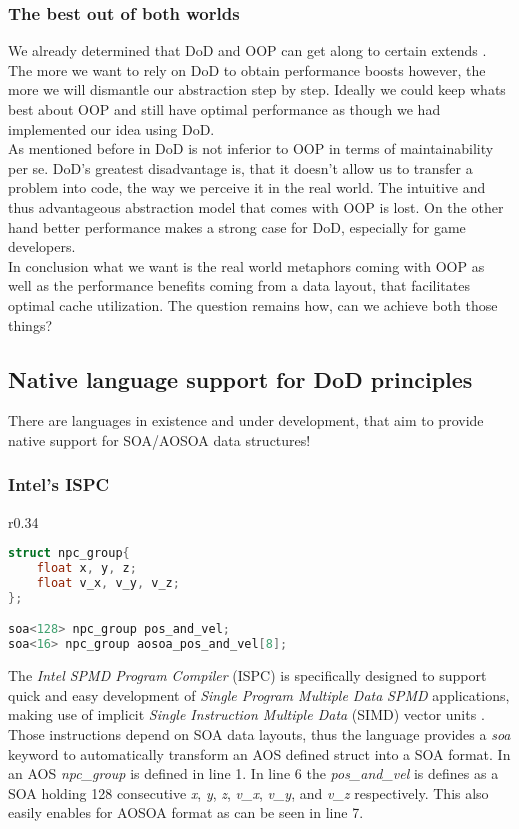 \subsubsection{The best out of both worlds}
We already determined that DoD and OOP can get along to certain extends . The more we want to rely on DoD to obtain performance boosts however, the more we will dismantle our abstraction step by step. Ideally we could keep whats best about OOP and still have optimal performance as though we had implemented our idea using DoD.\\
As mentioned before in  DoD is not inferior to OOP in terms of maintainability per se. DoD's greatest disadvantage is, that it doesn't allow us to transfer a problem into code, the way we perceive it in the real world. The intuitive and thus advantageous abstraction model that comes with OOP is lost. On the other hand better performance makes a strong case for DoD, especially for game developers.\\
In conclusion what we want is the real world metaphors coming with OOP as well as the performance benefits coming from a data layout, that facilitates optimal cache utilization. The question remains how, can we achieve both those things?

\subsection{Native language support for DoD principles}
There are languages in existence and under development, that aim to provide native support for SOA/AOSOA data structures!

\subsubsection{Intel's ISPC}
\begin{wrapfigure}[11]{r}{0.34\textwidth}
\begin{lstlisting}[language=C++,name={ISPC's native SOA support},morekeywords={soa}, label={ispc_npc}]
struct npc_group{
	float x, y, z;
	float v_x, v_y, v_z;
};

soa<128> npc_group pos_and_vel;
soa<16> npc_group aosoa_pos_and_vel[8];
\end{lstlisting}
\end{wrapfigure}
The \textit{Intel SPMD Program Compiler} (ISPC) is specifically designed to support quick and easy development of \textit{Single Program Multiple Data} \textit{SPMD} applications, making use of implicit \textit{Single Instruction Multiple Data} (SIMD) vector units .\\
Those instructions depend on SOA data layouts, thus the language provides a \textit{soa} keyword to automatically transform an AOS defined struct into a SOA format. In  an AOS \textit{npc\_group} is defined in line 1. In line 6 the \textit{pos\_and\_vel} is defines as a SOA holding 128 consecutive \textit{x}, \textit{y}, \textit{z}, \textit{v\_x}, \textit{v\_y}, and \textit{v\_z} respectively. This also easily enables for AOSOA format as can be seen in line 7.

